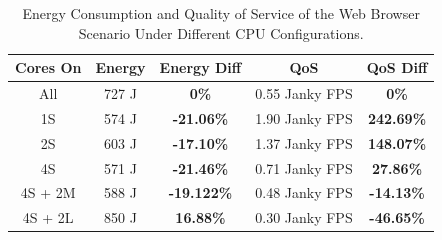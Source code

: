 \documentclass[conference]{IEEEtran}
\begin{document}
\begin{table}
\renewcommand{\arraystretch}{1.3}
\caption{Energy Consumption and Quality of Service of the Web Browser Scenario Under Different CPU Configurations.}
\label{tab:energyweb}
\centering
\begin{tabular}{|c|c|c|c|c|}
\hline
\textbf{Cores On} & \textbf{Energy} & \textbf{Energy Diff} &  \textbf{QoS} & \textbf{QoS Diff} \\
\hline
      All &  727 J &     \textbf{0\%}  & 0.55 Janky FPS & \textbf{0\%} \\ 
      1S & 574 J & \textbf{-21.06\%} & 1.90 Janky FPS & \textbf{242.69\%} \\
      2S & 603 J & \textbf{-17.10\%} & 1.37 Janky FPS & \textbf{148.07\%} \\
      4S & 571 J & \textbf{-21.46\%} & 0.71 Janky FPS & \textbf{27.86\%} \\
      4S + 2M & 588 J & \textbf{-19.122\%} & 0.48 Janky FPS & \textbf{-14.13\%}\\
      4S + 2L & 850 J &  \textbf{16.88\%} & 0.30 Janky FPS & \textbf{-46.65\%}\\
      
      \hline
\end{tabular}
\end{table}
\end{document}
